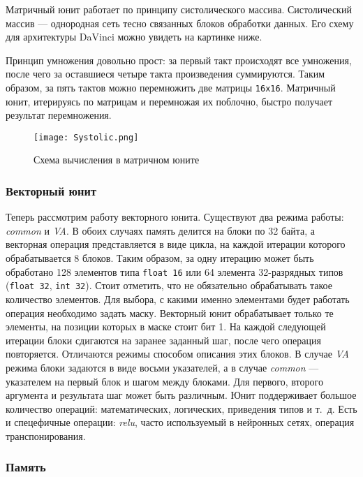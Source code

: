 Матричный юнит работает по принципу систолического массива.
Систолический массив --- однородная сеть тесно связанных блоков обработки данных.
Его схему для архитектуры DaVinci можно увидеть на картинке ниже.

Принцип умножения довольно прост: за первый такт происходят все умножения,
после чего за оставшиеся четыре такта произведения суммируются. Таким
образом, за пять тактов можно перемножить две матрицы \texttt{16x16}.
Матричный юнит, итерируясь по матрицам и перемножая их поблочно, быстро
получает результат перемножения.

\begin{figure}[h!]
    \centering
    \texttt{[image: Systolic.png]}
    \caption{Схема вычисления в матричном юните}
\end{figure}

\subsubsection{Векторный юнит}
\label{subsubsec:vec}

Теперь рассмотрим работу векторного юнита. Существуют два режима работы:
\textit{common} и \textit{VA}. В обоих случаях память делится на блоки
по 32 байта, а векторная операция представляется в виде цикла, на каждой
итерации которого обрабатывается 8 блоков. Таким образом, за одну итерацию
может быть обработано 128 элементов типа \texttt{float 16} или 64 элемента
32-разрядных типов (\texttt{float 32}, \texttt{int 32}). Стоит отметить, что
не обязательно обрабатывать такое количество элементов. Для выбора, с какими
именно элементами будет работать операция необходимо задать маску. Векторный
юнит обрабатывает только те элементы, на позиции которых в маске стоит бит 1.
На каждой следующей итерации блоки сдигаются на заранее заданный шаг,
после чего операция повторяется. Отличаются режимы способом описания этих блоков.
В случае \textit{VA} режима блоки задаются в виде восьми указателей, а в случае
\textit{common} --- указателем на первый блок и шагом между блоками. Для первого,
второго аргумента и результата шаг может быть различным. 
Юнит поддерживает большое количество операций: математических, логических,
приведения типов и т.~д. Есть и спецефичные операции: \textit{relu}, часто
используемый в нейронных сетях, операция транспонирования.

\subsubsection{Память}

